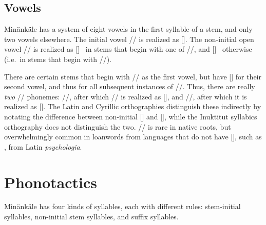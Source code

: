 \subsection{Vowels}\label{s:vowels}
Min\"ank\"ale has a system of eight vowels in the
first syllable of a stem, and only two vowels elsewhere. The initial vowel
// is realized as []. The non-initial open vowel // is
realized as []~ in stems that begin with one of
//, and []~ otherwise (i.e.~in stems that begin
with //).

There are certain stems that begin with // as the first vowel, but have
[] for their second vowel, and thus for all subsequent instances of
//. Thus, there are really \emph{two} // phonemes:
//, after which // is realized as [], and
//, after which it is realized as []. The Latin and
Cyrillic orthographies distinguish these indirectly by notating the difference
between non-initial [] and [], while the Inuktitut syllabics
orthography does not distinguish the two. // is rare in native
roots, but overwhelmingly common in loanwords from languages that do not have
[], such as , from Latin \textit{psychologia}.

\section{Phonotactics}
Min\"ank\"ale has four kinds of syllables, each with different rules:
stem-initial syllables, non-initial stem syllables, and suffix syllables.

